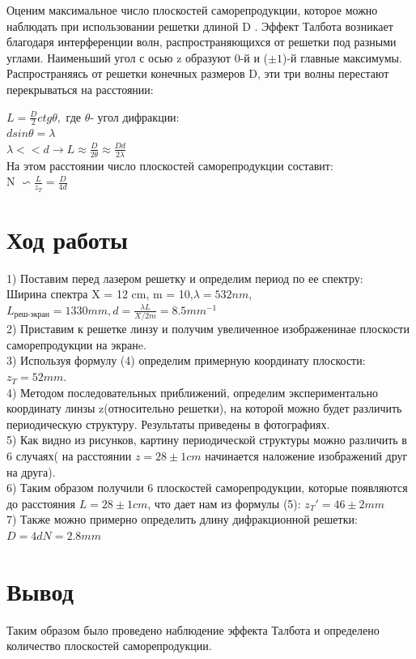 \documentclass[a4paper,12pt]{article} %
\begin{document}
        Оценим  максимальное число плоскостей саморепродукции, которое можно наблюдать при использовании решетки длиной D . Эффект  Талбота возникает благодаря интерференции волн, распространяющихся от решетки под разными углами. Наименьший угол с осью z образуют 0-й и ($\pm1$)-й главные максимумы.  Распространяясь от решетки конечных размеров D, эти три волны перестают перекрываться на расстоянии: \\
        \begin{center}
        $L=\frac{D}{2}ctg\theta,$ где $\theta$- угол дифракции: \\
        $dsin\theta=\lambda$\\
        $\lambda<<d \rightarrow L\approx\frac{D}{2\theta}\approx\frac{Dd}{2\lambda} $ \\
        На этом расстоянии число плоскостей саморепродукции составит: \\
       N $\backsim \frac{L}{z_T	}= \frac{D}{4d}$
       \end{center}

\section{Ход работы}
1) Поставим перед лазером решетку и определим период по ее спектру: \\
Ширина спектра X = 12 cm, m = 10,$\lambda= 532 nm$, $L_{\text{реш-экран}}=1330 mm,  d=\frac{\lambda L}{X/2m}= 8.5 mm^{-1}$   \\
2) Приставим к решетке линзу и получим увеличенное изображенинае плоскости саморепродукции на экранe. \\
3) Используя формулу (4) определим примерную координату плоскости: $z_T=52 mm$. \\
4) Методом последовательных приближений, определим экспериментально  координату линзы z(относительно решетки), на которой можно будет различить периодическую структуру. Результаты приведены в фотографиях. \\
5) Как видно из рисунков, картину периодической структуры можно различить в 6 случаях( на расстоянии $z=28\pm1 cm $ начинается наложение изображений друг на друга). \\
6) Таким образом получили 6 плоскостей саморепродукции, которые появляются до расстояния $L=28\pm1 cm $, что дает нам из формулы (5): $z_T '= 46\pm2 mm$ \\
7) Также можно примерно определить длину дифракционной решетки: $D=  4dN=2.8 mm $ \\
\section{Вывод}
Таким образом было проведено наблюдение эффекта Талбота и определено количество плоскостей саморепродукции.
\end{document}
